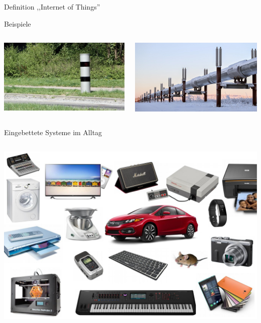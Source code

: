 {\begin{frame}{Definition ,,Internet of Things''}
\begin{block}{Beispiele}
\begin{columns}[onlytextwidth]
            \includegraphics[width=\textwidth]{img/blitzer_pulverhausstrasse}

            \includegraphics[width=\textwidth]{img/winter-681175_640}
        \end{columns}
    \end{block}
\end{frame}
}

\begin{frame}{Eingebettete Systeme im Alltag}
    \begin{columns}
        \column{\dimexpr\paperwidth}
        \includegraphics[width=\textwidth, height=\textheight-3em]{img/embedded_devices}
    \end{columns}
\end{frame}

